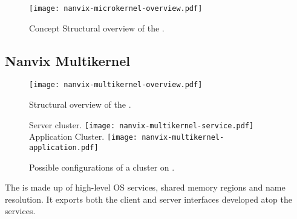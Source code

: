 		\begin{figure}[!tb]
			\centering%
			\caption{Concept Structural overview of the \microkernel.}%
			\label{fig:microkernel-overview}%
			\texttt{[image: nanvix-microkernel-overview.pdf]}%
		\end{figure}
	
	\subsection{Nanvix Multikernel}
	\label{sec.multikernel}

		\begin{figure}[!tb]
			\centering%
			\caption{Structural overview of the \multikernel.}%
			\label{fig:multikernel-overview}%
			\texttt{[image: nanvix-multikernel-overview.pdf]}%
		\end{figure}

		\begin{figure}[!tb]
			\centering%
			\caption{Possible configurations of a cluster on \multikernel.}%
			\label{fig:uma}%

				{Server cluster.}%
				{\texttt{[image: nanvix-multikernel-service.pdf]}}%
			\hspace{1.5cm}%
				{Application Cluster.}%
				{\texttt{[image: nanvix-multikernel-application.pdf]}}%

		\end{figure}

		The \multikernel is made up of high-level OS services, \eg shared memory
		regions and name resolution.
		It exports both the client and server interfaces developed atop	the \microkernel services.